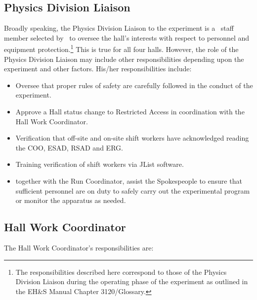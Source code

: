 \documentclass[10pt]{article}
\begin{document}
\subsection{Physics Division Liaison}

Broadly speaking, the Physics Division Liaison to the experiment 
is a \HALL\ staff member selected by \HALLLEADER\
to oversee the hall's interests with respect to personnel and equipment 
protection.\footnote{The responsibilities described here correspond 
to those of the Physics Division Liaison during
the operating phase of the experiment as outlined in the
EH\&S Manual Chapter 3120/Glossary.} 
This is true for all four halls. However, the role of
the Physics Division Liaison may include other responsibilities
depending upon the experiment and other factors. His/her responsibilities
include:
\begin{itemize}
\item Oversee that proper rules of safety are carefully followed in the 
conduct of the experiment.
\item Approve a Hall status change to Restricted Access in coordination
with the Hall Work Coordinator.
\item  Verification that off-site and on-site shift workers have acknowledged reading the COO, ESAD, RSAD
and ERG.
\item Training verification of shift workers via JList software.
\item  together with the Run Coordinator, assist the Spokespeople to ensure that sufficient personnel are on
duty to safely carry out the experimental program or monitor the apparatus as needed.
\end{itemize}  

\subsection{Hall Work Coordinator}

The Hall Work Coordinator's responsibilities are: 
\end{document}
